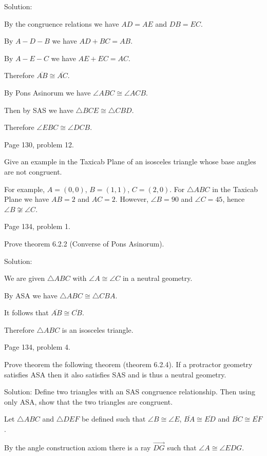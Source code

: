 \bigskip
\noindent
Solution:

\medskip
By the congruence relations we have $AD=AE$ and $DB=EC$.

\medskip
By $A{-}D{-}B$ we have $AD+BC=AB$.

\medskip
By $A{-}E{-}C$ we have $AE+EC=AC$.

\medskip
Therefore $\overline{AB}\cong\overline{AC}$.

\medskip
By Pons Asinorum we have $\angle ABC\cong\angle ACB$.

\medskip
Then by SAS we have $\triangle BCE\cong\triangle CBD$.

\medskip
Therefore $\angle EBC\cong\angle DCB$.

\beginsection Page 130, problem 12.

Give an example in the Taxicab Plane of an isosceles triangle whose
base angles are not congruent.

\bigskip
\noindent
For example, $A=(0,0)$, $B=(1,1)$, $C=(2,0)$.
For $\triangle ABC$ in the Taxicab Plane we have $AB=2$ and $AC=2$.
However, $\angle B=90$ and $\angle C=45$,
hence $\angle B\not\cong\angle C$.

\beginsection Page 134, problem 1.

Prove theorem 6.2.2 (Converse of Pons Asinorum).

\bigskip
\noindent
Solution:

\medskip
We are given $\triangle ABC$ with $\angle A\cong\angle C$ in a neutral geometry.

\medskip
By ASA we have $\triangle ABC\cong\triangle CBA$.

\medskip
It follows that $\overline{AB}\cong\overline{CB}$.

\medskip
Therefore $\triangle ABC$ is an isosceles triangle.

\beginsection Page 134, problem 4.

Prove theorem the following theorem (theorem 6.2.4).
\medskip
\noindent
If a protractor geometry satisfies ASA then it also satisfies SAS
and is thus a neutral geometry.

\bigskip
\noindent
Solution: Define two triangles with an SAS congruence
relationship. Then using only ASA, show that the two triangles
are congruent.

\medskip
Let $\triangle ABC$ and $\triangle DEF$ be defined such that
$\angle B\cong\angle E$,
$\overline{BA}\cong\overline{ED}$ and
$\overline{BC}\cong\overline{EF}$.

\medskip
By the angle construction axiom there is a ray $\overrightarrow{DG}$
such that $\angle A\cong\angle EDG$.

